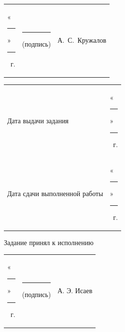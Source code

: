 \documentclass[14pt, a4paper]{extarticle}
\begin{document}
{
\renewcommand{\arraystretch}{2}
\noindent
\begin{tabularx}{\textwidth}{@{} P{0.45\textwidth} P{0.3\textwidth} P{0.25\textwidth} @{}}

    «\rule{0.8cm}{0.4pt}» \quad \rule{2cm}{0.4pt} ~г. &
    \centering \rule{3.5cm}{0.4pt} \par \footnotesize (подпись) &
    \hfill А.~С.~Кружалов                                         \\
\end{tabularx}

\begin{tabularx}{\textwidth}{@{} P{0.45\textwidth} P{0.55\textwidth} @{}}
    Дата выдачи задания           &
    \hfill «\rule{0.8cm}{0.4pt}» \quad \rule{2cm}{0.4pt} ~г. \\

    Дата сдачи выполненной работы &
    \hfill «\rule{0.8cm}{0.4pt}» \quad \rule{2cm}{0.4pt} ~г. \\
\end{tabularx}
}

Задание принял к исполнению

{
\renewcommand{\arraystretch}{1.5}
\begin{tabularx}{\textwidth}{@{} P{0.45\textwidth} P{0.3\textwidth} P{0.25\textwidth} @{}}

    «\rule{0.8cm}{0.4pt}» \quad \rule{2cm}{0.4pt} ~г. &
    \centering \rule{3.5cm}{0.4pt} \par \footnotesize (подпись) &
    \hfill А. Э. Исаев                                            \\
\end{tabularx}
}
\end{document}
